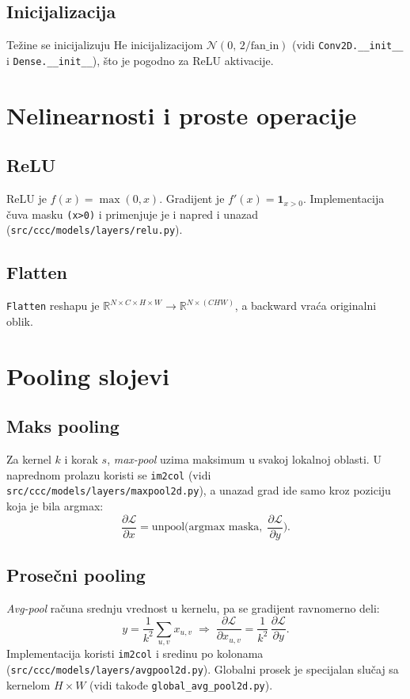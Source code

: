 \documentclass[11pt,a4paper]{article}
\begin{document}
\subsection{Inicijalizacija}
Težine se inicijalizuju He inicijalizacijom $\mathcal{N}(0,\, 2/\text{fan\_in})$ (vidi \texttt{Conv2D.__init__} i \texttt{Dense.__init__}), što je pogodno za ReLU aktivacije.

\section{Nelinearnosti i proste operacije}
\subsection{ReLU}
ReLU je $f(x)=\max(0,x)$. Gradijent je $f'(x)=\mathbf{1}_{x>0}$. Implementacija čuva masku \texttt{(x>0)} i primenjuje je i napred i unazad (\texttt{src/ccc/models/layers/relu.py}).

\subsection{Flatten}
\texttt{Flatten} reshapu je $\mathbb{R}^{N\times C\times H\times W} \to \mathbb{R}^{N\times (CHW)}$, a backward vraća originalni oblik.

\section{Pooling slojevi}
\subsection{Maks pooling}
Za kernel $k$ i korak $s$, \emph{max-pool} uzima maksimum u svakoj lokalnoj oblasti. U naprednom prolazu koristi se \texttt{im2col} (vidi \texttt{src/ccc/models/layers/maxpool2d.py}), a unazad grad ide samo kroz poziciju koja je bila argmax:
\begin{equation}
 \frac{\partial \mathcal{L}}{\partial x} = \text{unpool}\bigl(\text{argmax maska},\; \frac{\partial \mathcal{L}}{\partial y}\bigr).
\end{equation}

\subsection{Prosečni pooling}
\emph{Avg-pool} računa srednju vrednost u kernelu, pa se gradijent ravnomerno deli:
\begin{equation}
 y = \frac{1}{k^2} \sum_{u,v} x_{u,v} \;\Rightarrow\; \frac{\partial \mathcal{L}}{\partial x_{u,v}} = \frac{1}{k^2}\, \frac{\partial \mathcal{L}}{\partial y}.
\end{equation}
Implementacija koristi \texttt{im2col} i sredinu po kolonama (\texttt{src/ccc/models/layers/avgpool2d.py}). Globalni prosek je specijalan slučaj sa kernelom $H\times W$ (vidi takođe \texttt{global\_avg\_pool2d.py}).
\end{document}
